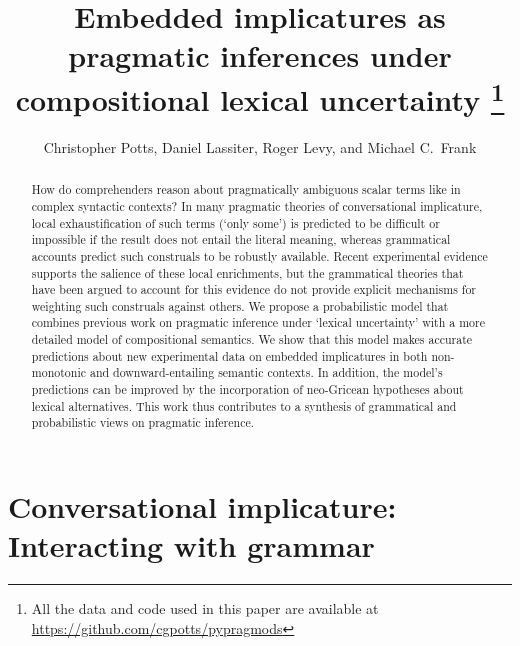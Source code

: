 \documentclass[leqno,12pt]{article}
\begin{document}
\renewcommand{\marginnote}[1]{}
\renewcommand{\todo}[1]{}
\renewcommand{\Rogersmarginnote}[1]{}


\title{Embedded implicatures as pragmatic inferences under compositional lexical uncertainty%
  \thanks{All the data and code used in this paper are available at \url{https://github.com/cgpotts/pypragmods}}}
\author{Christopher Potts, Daniel Lassiter, Roger Levy, and Michael C.~Frank}
\maketitle

\marginnote{Light revision to abstract in response to objections that it's not about what's possible but rather about what's marked.}

\begin{abstract} 
  How do comprehenders reason about pragmatically ambiguous scalar
  terms like  in complex syntactic contexts?  In many
  pragmatic theories of conversational implicature, local
  exhaustification of such terms (`only some') is predicted to be
  difficult or impossible if the result does not entail the literal
  meaning, whereas grammatical accounts predict such construals to be
  robustly available. Recent experimental evidence supports the
  salience of these local enrichments, but the grammatical theories
  that have been argued to account for this evidence do not provide explicit mechanisms for
  weighting such construals against others. We propose a probabilistic
  model that combines previous work on pragmatic inference under
  `lexical uncertainty' with a more detailed model of compositional
  semantics. We show that this model makes accurate predictions about
  new experimental data on embedded implicatures in both non-monotonic
  and downward-entailing semantic contexts. In addition, the model's
  predictions can be improved by the incorporation of neo-Gricean
  hypotheses about lexical alternatives. This work thus contributes to
  a synthesis of grammatical and probabilistic views on pragmatic
  inference.
\end{abstract}


\section{Conversational implicature: Interacting with grammar}\label{sec:introduction}
\end{document}
